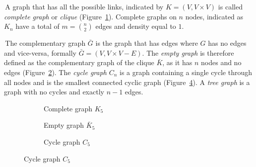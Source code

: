 \noindent\textbullet \,A graph that has all the possible links, indicated by $K=(V,V\times V)$ is called \emph{complete graph} or \emph{clique} (Figure~\ref{fig:completegraph}). Complete graphs on $n$ nodes, indicated as $K_n$ have a total of $m=\binom{n}{2}$ edges and density equal to $1$.

\noindent\textbullet \,The complementary graph $\bar{G}$ is the graph that has edges where $G$ has no edges and vice-versa, formally $\bar{G}=(V,V\times V - E)$.
The \emph{empty graph} is therefore defined as the complementary graph of the clique $\bar{K}$, as it has $n$ nodes and no edges (Figure~\ref{fig:emptygraph}). The \emph{cycle graph} $C_n$ is a graph containing a single cycle through all nodes and is the smallest connected cyclic graph (Figure~\ref{fig:cyclegraph}). A \emph{tree graph} is a graph with no cycles and exactly $n-1$ edges.

\noindent\begin{figure}[htb]
\centering
	\begin{subfigure}[t]{0.3\textwidth}\centering
	\caption{{\footnotesize Complete graph $K_5$}}\label{fig:completegraph}
	\end{subfigure}
	\begin{subfigure}[t]{0.3\textwidth}\centering
	\caption{{\footnotesize Empty graph $\bar{K}_5$}}\label{fig:emptygraph}
	\end{subfigure}
	\begin{subfigure}[t]{0.3\textwidth}\centering
	\caption{{\footnotesize Cycle graph $C_5$}}\label{fig:cyclegraph}
	\end{subfigure}
\end{figure}

